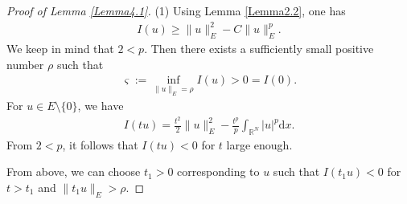 \documentclass[10pt,a4paper]{amsart}
\begin{document}
\begin{proof}[Proof of Lemma \ref{Lemma4.1}]
(1) Using Lemma \ref{Lemma2.2}, one has
\begin{equation*}
\begin{aligned}
I(u)
\geqslant \|u\|_{E}^{2}
-C\|u\|_{E}^{p}.
\end{aligned}
\end{equation*}
We keep in mind that $2<p$. Then there exists a sufficiently small positive number $\rho$ such that
\begin{equation*}
\begin{aligned}
\varsigma :=
\inf_{\|u\|_{E}=\rho}
I(u)>0=I(0).
\end{aligned}
\end{equation*}
For $u\in E\setminus\{0\}$, we have
\begin{equation*}
\begin{aligned}
I(tu)
=
\frac{t^{2}}{2}
\|u\|_{E}^{2}
-\frac{t^{p}}{p}
\int_{\mathbb{R}^{N}}|u|^{p}\mathrm{d}x.
\end{aligned}
\end{equation*}
From $2<p$, it follows that $I(tu)<0$ for $t$ large enough.

From above,
we can choose $t_{1}>0$ corresponding to $u$ such that $I(t_{1}u)<0$ for $t>t_{1}$ and $\|t_{1}u\|_{E}>\rho$.


\end{proof}
\end{document}
